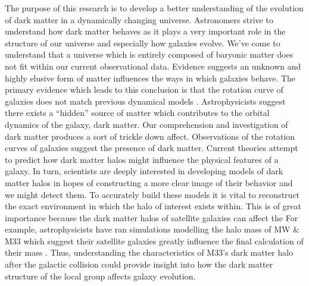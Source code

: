 \documentclass[fleqn,usenatbib]{mnras}
\begin{document}
The purpose of this research is to develop a better understanding of the evolution of dark matter in a dynamically changing universe. Astronomers strive to understand how dark matter behaves as it plays a very important role in the structure of our universe and especially how galaxies evolve. We've come to understand that a universe which is entirely composed of baryonic matter does not fit within our current observational data. Evidence suggests an unknown and highly elusive form of matter influences the ways in which galaxies behave. The primary evidence which leads to this conclusion is that the rotation curve of galaxies does not match previous dynamical models \citep{Hoeneisen19}. Astrophysicists suggest there exists a ``hidden'' source of matter which contributes to the orbital dynamics of the galaxy, dark matter. Our comprehension and investigation of dark matter produces a sort of trickle down affect. Observations of the rotation curves of galaxies suggest the presence of dark matter. Current theories attempt to predict how dark matter halos might influence the physical features of a galaxy. In turn, scientists are deeply interested in developing models of dark matter halos in hopes of constructing a more clear image of their behavior and we might detect them. To accurately build these models it is vital to reconstruct the exact environment in which the halo of interest exists within. This is of great importance because the dark matter halos of satellite galaxies can affect the  For example, astrophysicists have ran simulations modelling the halo mass of MW \& M33 which suggest their satellite galaxies greatly influence the final calculation of their mass \citep{Patel17}. Thus, understanding the characteristics of M33's dark matter halo after the galactic collision could provide insight into how the dark matter structure of the local group affects galaxy evolution.
\end{document}
